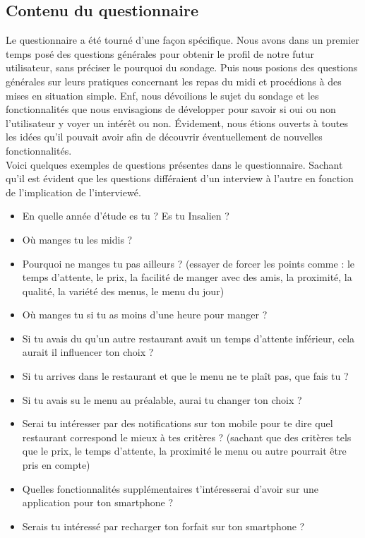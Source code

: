 \subsection{Contenu du questionnaire}
Le questionnaire a été tourné d’une façon spécifique. Nous avons dans un 
premier temps posé des questions générales pour obtenir le profil de notre
futur utilisateur, sans préciser le pourquoi du sondage. Puis nous posions 
des questions générales sur leurs pratiques concernant les repas du midi
et procédions à des mises en situation simple. Enf, nous dévoilions le
sujet du sondage et les fonctionnalités que nous envisagions de
développer pour savoir si oui ou non l’utilisateur y voyer un intérêt ou non. 
Évidement, nous étions ouverts à toutes les idées qu’il pouvait avoir
afin de découvrir éventuellement de nouvelles fonctionnalités. \\
Voici quelques exemples de questions présentes dans le questionnaire. 
Sachant qu’il est évident que les questions différaient d’un interview à 
l’autre en fonction de l’implication de l’interviewé. 
\begin{itemize}
\item En quelle année d’étude es tu ? Es tu Insalien ?
\item Où manges tu les midis ?
\item Pourquoi ne manges tu pas ailleurs ? (essayer de forcer les points
comme : le temps d’attente, le prix, la facilité de manger avec des amis,
la proximité, la qualité, la variété des menus, le menu du jour)
\item Où manges tu si tu as moins d’une heure pour manger ?
\item Si tu avais du qu’un autre restaurant avait un temps d’attente inférieur, 
cela aurait il influencer ton choix ? 
\item Si tu arrives dans le restaurant et que le menu ne te plaît pas,
que fais tu ?
\item Si tu avais su le menu au préalable, aurai tu changer ton choix ?
\item Serai tu intéresser par des notifications sur ton mobile pour te dire 
quel restaurant correspond le mieux à tes critères ? (sachant que des 
critères tels que le prix, le temps d’attente, la proximité le menu ou autre
pourrait être pris en compte)
\item Quelles fonctionnalités supplémentaires t’intéresserai d’avoir sur 
une application pour ton smartphone ?
\item Serais tu intéressé par recharger ton forfait sur ton smartphone ?
\end{itemize}

